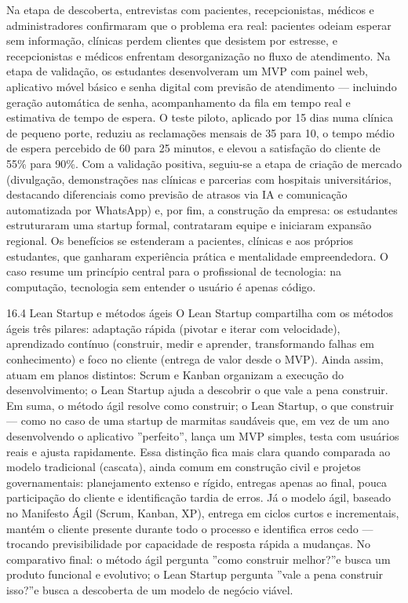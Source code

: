 Na etapa de descoberta, entrevistas com pacientes, recepcionistas, médicos e administradores confirmaram que o problema era real: pacientes odeiam esperar sem informação, clínicas perdem clientes que desistem por estresse, e recepcionistas e médicos enfrentam desorganização no fluxo de atendimento. Na etapa de validação, os estudantes desenvolveram um MVP com painel web, aplicativo móvel básico e senha digital com previsão de atendimento — incluindo geração automática de senha, acompanhamento da fila em tempo real e estimativa de tempo de espera. O teste piloto, aplicado por 15 dias numa clínica de pequeno porte, reduziu as reclamações mensais de 35 para 10, o tempo médio de espera percebido de 60 para 25 minutos, e elevou a satisfação do cliente de 55\% para 90\%. Com a validação positiva, seguiu-se a etapa de criação de mercado (divulgação, demonstrações nas clínicas e parcerias com hospitais universitários, destacando diferenciais como previsão de atrasos via IA e comunicação automatizada por WhatsApp) e, por fim, a construção da empresa: os estudantes estruturaram uma startup formal, contrataram equipe e iniciaram expansão regional. Os benefícios se estenderam a pacientes, clínicas e aos próprios estudantes, que ganharam experiência prática e mentalidade empreendedora. O caso resume um princípio central para o profissional de tecnologia: na computação, tecnologia sem entender o usuário é apenas código.

16.4 Lean Startup e métodos ágeis O Lean Startup compartilha com os métodos ágeis três pilares: adaptação rápida (pivotar e iterar com velocidade), aprendizado contínuo (construir, medir e aprender, transformando falhas em conhecimento) e foco no cliente (entrega de valor desde o MVP). Ainda assim, atuam em planos distintos: Scrum e Kanban organizam a execução do desenvolvimento; o Lean Startup ajuda a descobrir o que vale a pena construir. Em suma, o método ágil resolve como construir; o Lean Startup, o que construir — como no caso de uma startup de marmitas saudáveis que, em vez de um ano desenvolvendo o aplicativo ”perfeito”, lança um MVP simples, testa com usuários reais e ajusta rapidamente. Essa distinção fica mais clara quando comparada ao modelo tradicional (cascata), ainda comum em construção civil e projetos governamentais: planejamento extenso e rígido, entregas apenas ao final, pouca participação do cliente e identificação tardia de erros. Já o modelo ágil, baseado no Manifesto Ágil (Scrum, Kanban, XP), entrega em ciclos curtos e incrementais, mantém o cliente presente durante todo o processo e identifica erros cedo — trocando previsibilidade por capacidade de resposta rápida a mudanças. No comparativo final: o método ágil pergunta ”como construir melhor?”e busca um produto funcional e evolutivo; o Lean Startup pergunta ”vale a pena construir isso?”e busca a descoberta de um modelo de negócio viável.

